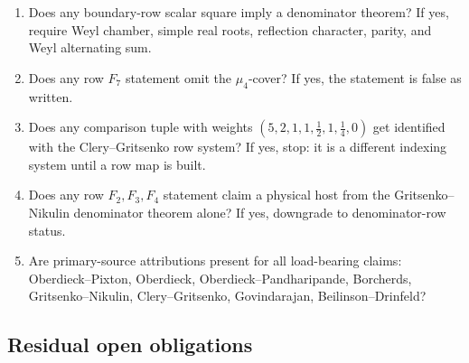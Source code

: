 \begin{enumerate}
realization.
\item Does any boundary-row scalar square imply a denominator theorem?
If yes, require Weyl chamber, simple real roots, reflection character,
parity, and Weyl alternating sum.
\item Does any row \(F_7\) statement omit the \(\mu_4\)-cover?  If yes,
the statement is false as written.
\item Does any comparison tuple with weights
\((5,2,1,1,\tfrac12,1,\tfrac14,0)\) get identified with the
Clery--Gritsenko row system?  If yes, stop: it is a different indexing
system until a row map is built.
\item Does any row \(F_2,F_3,F_4\) statement claim a physical host from
the Gritsenko--Nikulin denominator theorem alone?  If yes, downgrade to
denominator-row status.
\item Are primary-source attributions present for all load-bearing
claims: Oberdieck--Pixton, Oberdieck, Oberdieck--Pandharipande,
Borcherds, Gritsenko--Nikulin, Clery--Gritsenko, Govindarajan,
Beilinson--Drinfeld?
\end{enumerate}

\subsection{Residual open obligations}

